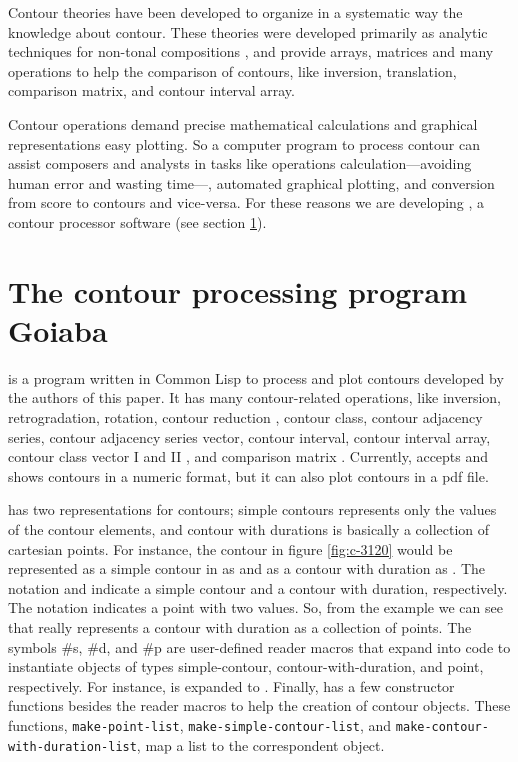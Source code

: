 Contour theories
\cite{friedmann85:methodology,friedmann87:response,morris87:composition,morris93:directions,marvin.ea87:relating,marvin88:generalized,marvin.ea95:generalization,polansky.ea92:possible,quinn97:fuzzy,clifford95:contour,beard03:contour}
have been developed to organize in a systematic way the knowledge
about contour. These theories were developed primarily as analytic
techniques for non-tonal compositions \cite{beard03:contour}, and
provide arrays, matrices and many operations to help the comparison of
contours, like inversion, translation, comparison matrix, and contour
interval array.

Contour operations demand precise mathematical calculations and
graphical representations easy plotting. So a computer program to
process contour can assist composers and analysts in tasks like
operations calculation---avoiding human error and wasting time---,
automated graphical plotting, and conversion from score to contours
and vice-versa. For these reasons we are developing \goiaba{}, a
contour processor software (see section \ref{sec:goiaba}).

\section{The contour processing program Goiaba}
\label{sec:goiaba}

\goiaba{} is a program written in Common Lisp
\cite{graham94:lisp,team07:sbcl} to process and plot contours
developed by the authors of this paper. It has many contour-related
operations, like inversion, retrogradation, rotation, contour
reduction \cite{adams76:melodic}, contour class, contour adjacency
series, contour adjacency series vector, contour interval, contour
interval array, contour class vector I and II
\cite{friedmann85:methodology}, and comparison matrix
\cite{morris93:directions}. Currently, \goiaba{} accepts and shows
contours in a numeric format, but it can also plot contours in a pdf
file.

\goiaba{} has two representations for contours; simple contours
represents only the values of the contour elements, and contour with
durations is basically a collection of cartesian points. For instance,
the contour in figure \ref{fig:c-3120} would be represented as a
simple contour in \goiaba{} as  and as a contour
with duration as . The
notation  and  indicate a simple
contour and a contour with duration, respectively. The notation
 indicates a point with two values. So, from the
example we can see that \goiaba{} really represents a contour with
duration as a collection of points. The symbols \#s, \#d, and \#p are
user-defined reader macros that expand into code to instantiate
objects of types simple-contour, contour-with-duration, and point,
respectively. For instance,  is expanded to
. Finally, \goiaba{} has a few
constructor functions besides the reader macros to help the creation
of contour objects. These functions, \texttt{make-point-list},
\texttt{make-sim\-ple-contour-list}, and
\texttt{make-contour-with-dura\-tion-list}, map a list to the
correspondent object.

